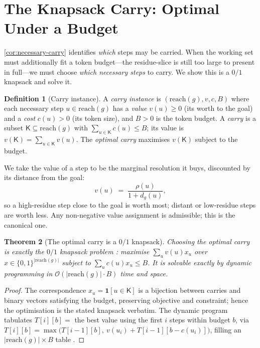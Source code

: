 \documentclass[11pt,twocolumn,a4paper]{article}
\theoremstyle{thmstyle}
\newtheorem{theorem}{Theorem}[section]
\theoremstyle{definition}
\newtheorem{definition}[theorem]{Definition}
\theoremstyle{remark}
\newcommand{\res}{\rho}                 %
\newcommand{\goal}{g}                   %
\newcommand{\reach}{\mathrm{reach}}
\newcommand{\keep}{\mathsf{K}}
\newcommand{\budget}{B}
\newcommand{\val}{v}                    %
\newcommand{\cost}{c}                   %
\newcommand{\abs}[1]{\lvert#1\rvert}
\newcommand{\set}[1]{\{#1\}}
\begin{document}
\section{The Knapsack Carry: Optimal Under a Budget}
\label{sec:knapsack}

\cref{cor:necessary-carry} identifies \emph{which} steps may be carried. When
the working set must additionally fit a token budget---the residue-slice is still
too large to present in full---we must choose \emph{which necessary steps} to
carry. We show this is a $0/1$ knapsack and solve it.

\begin{definition}[Carry instance]
\label{def:carry}
A \emph{carry instance} is $(\reach(\goal),\val,\cost,\budget)$ where each
necessary step $u\in\reach(\goal)$ has a \emph{value} $\val(u)\ge0$ (its worth to
the goal) and a \emph{cost} $\cost(u)>0$ (its token size), and $\budget>0$ is the
token budget. A \emph{carry} is a subset $\keep\subseteq\reach(\goal)$ with
$\sum_{u\in\keep}\cost(u)\le\budget$; its value is $\val(\keep)=\sum_{u\in\keep}\val(u)$.
The \emph{optimal carry} maximises $\val(\keep)$ subject to the budget.
\end{definition}

We take the value of a step to be the marginal resolution it buys, discounted by
its distance from the goal:
\[
\val(u)\;=\;\frac{\res(u)}{1+d_\goal(u)},
\]
so a high-residue step close to the goal is worth most; distant or low-residue
steps are worth less. Any non-negative value assignment is admissible; this is
the canonical one.

\begin{theorem}[The optimal carry is a $0/1$ knapsack]
\label{thm:knapsack}
Choosing the optimal carry is exactly the $0/1$ knapsack problem
\citep{dantzig1957,kellerer2004}: maximise $\sum_u \val(u)x_u$ over
$x\in\set{0,1}^{\abs{\reach(\goal)}}$ subject to $\sum_u\cost(u)x_u\le\budget$.
It is solvable exactly by dynamic programming in
$\mathcal{O}(\abs{\reach(\goal)}\cdot\budget)$ time and space.
\end{theorem}

\begin{proof}
The correspondence $x_u=\mathbf 1[u\in\keep]$ is a bijection between carries and
binary vectors satisfying the budget, preserving objective and constraint; hence
the optimisation is the stated knapsack verbatim. The dynamic program tabulates
$T[i][b]=$ the best value using the first $i$ steps within budget $b$, via
$T[i][b]=\max\bigl(T[i-1][b],\ \val(u_i)+T[i-1][b-\cost(u_i)]\bigr)$, filling an
$\abs{\reach(\goal)}\times\budget$ table \citep{nemhauser1988}.
\end{proof}
\end{document}
